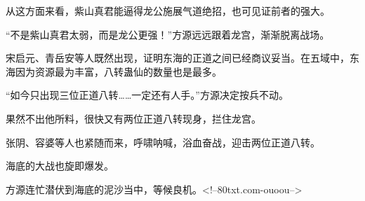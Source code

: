 \begin{this_body}
从这方面来看，紫山真君能逼得龙公施展气道绝招，也可见证前者的强大。

“不是紫山真君太弱，而是龙公更强！”方源远远跟着龙宫，渐渐脱离战场。

宋启元、青岳安等人既然出现，证明东海的正道之间已经商议妥当。在五域中，东海因为资源最为丰富，八转蛊仙的数量也是最多。

“如今只出现三位正道八转……一定还有人手。”方源决定按兵不动。

果然不出他所料，很快又有两位正道八转现身，拦住龙宫。

张阴、容婆等人也紧随而来，呼啸呐喊，浴血奋战，迎击两位正道八转。

海底的大战也旋即爆发。

方源连忙潜伏到海底的泥沙当中，等候良机。<!--80txt.com-ouoou-->

\end{this_body}

